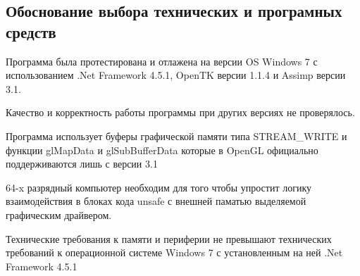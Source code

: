 \subsection{Обоснование выбора технических и програмных средств}
Программа была протестирована и отлажена на версии OS Windows 7 с использованием .Net Framework 4.5.1, OpenTK версии 1.1.4 и Assimp версии 3.1.

Качество и корректность работы программы при других версиях не проверялось.

Программа использует буферы графической памяти типа STREAM\_WRITE и функции glMapData и glSubBufferData которые в OpenGL официально поддерживаются лишь с версии 3.1

64-x разрядный компьютер необходим для того чтобы упростит логику взаимодействия в блоках кода unsafe с внешней паматью выделяемой графическим драйвером.

Технические требования к памяти и периферии не превышают технических требований к операционной системе Windows 7 с установленным на ней .Net Framework 4.5.1
